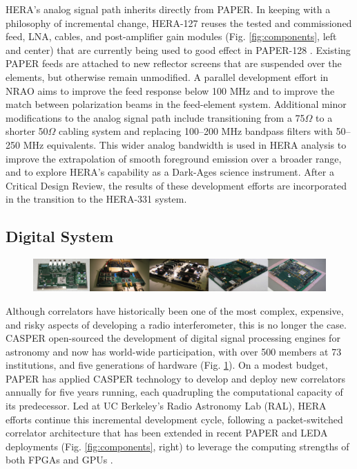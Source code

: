 \documentclass[ars]{/Users/daviddeboer1/Documents/Papers/Copernicus_LaTeX_Package_v_2_7/copernicus}
\begin{document}
HERA's analog signal path inherits directly from PAPER.
In keeping with a philosophy of
incremental change,
HERA-127 reuses the tested and commissioned feed, LNA, cables, and post-amplifier gain modules
(Fig. \ref{fig:components}, left and center) that are currently being
used to good effect in PAPER-128 .  Existing PAPER feeds are attached to new
reflector screens that are suspended over the elements, but otherwise remain unmodified.
A parallel development effort in NRAO aims to improve the feed response below
100 MHz 
and to improve the match between polarization beams in the feed-element system.  
Additional
minor modifications to the analog signal path include transitioning from a 75$\Omega$ to a
shorter 50$\Omega$ cabling system and replacing 100--200 MHz bandpass filters with 50--250 MHz equivalents.
This wider analog bandwidth is used in HERA analysis to improve the extrapolation of smooth foreground
emission over a broader range, and to explore HERA's capability as a Dark-Ages science instrument.
After a Critical Design Review, the results of these development efforts are incorporated in
the transition to the HERA-331 system.  


\subsection{Digital System}
\label{sec:digital}

\begin{figure}[t]\centering
\includegraphics[width=6.5in]{plots/casper_boards.jpg}
\label{fig:casper_boards}
\end{figure}

Although correlators have historically been one of the most complex,
expensive, and risky aspects of developing a radio interferometer, this is no longer the case.
CASPER 
open-sourced the development of digital signal processing engines for astronomy and
now has world-wide participation,
with over 500 members at 73 institutions, and 
five generations of hardware (Fig. \ref{fig:casper_boards}). 
On a modest budget, PAPER has applied CASPER technology to develop and deploy new correlators
annually for five years running, each quadrupling the computational capacity of its predecessor.
Led at UC Berkeley's Radio Astronomy Lab (RAL),
HERA efforts continue this incremental development cycle, following a packet-switched
correlator architecture  that has been
extended in recent PAPER and LEDA deployments (Fig. \ref{fig:components}, right)
to leverage the computing strengths of both FPGAs and GPUs \citep{clark_et_al2011}.
\end{document}
